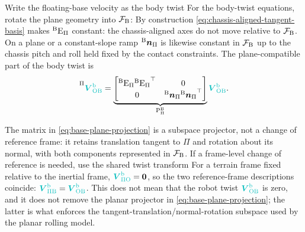 \documentclass[10pt]{article}
\begin{document}
Write the floating-base velocity as the body twist
For the body-twist equations, rotate the plane geometry into $\cframe[fb]$:
By construction \eqref{eq:chassis-aligned-tangent-basis} makes
${}^{\text{B}}\text{E}_{\Pi}$ constant: the chassis-aligned axes do not move
relative to $\cframe[fb]$. On a plane or a constant-slope ramp
${}^{\text{B}}\boldsymbol{n}_{\Pi}$ is likewise constant in $\cframe[fb]$ up to
the chassis pitch and roll held fixed by the contact constraints.
The plane-compatible part of the body twist is
\begin{equation}
  \label{eq:base-plane-projection}
  \prescript{\Pi}{}{\bodyVel{\inertialFrame}{\fbFrame}}
  =
  \underbrace{
    \begin{bmatrix}
      {}^{\fbFrame}\text{E}_{\Pi}
        \transpose{{}^{\fbFrame}\text{E}_{\Pi}} & \zeroMatrix\\
      \zeroMatrix &
        {}^{\fbFrame}\surfaceNormal_{\Pi}
        \transpose{{}^{\fbFrame}\surfaceNormal_{\Pi}}
    \end{bmatrix}
  }_{\text{P}^{\fbFrame}_{\Pi}}
  \bodyVel{\inertialFrame}{\fbFrame}.
\end{equation}


The matrix in \eqref{eq:base-plane-projection} is a subspace projector, not
a change of reference frame: it retains translation tangent to $\Pi$ and
rotation about its normal, with both components represented in $\cframe[fb]$.
If a frame-level change of reference is needed, use the shared twist transform
For a terrain frame fixed relative to the inertial frame,
$\bodyVel{\Pi}{\inertialFrame}=\zeroVector$, so the two reference-frame
descriptions coincide:
$\bodyVel{\Pi}{\fbFrame}=\bodyVel{\inertialFrame}{\fbFrame}$.
This does not mean that the robot twist
$\bodyVel{\inertialFrame}{\fbFrame}$ is zero, and it does not remove the
planar projector in \eqref{eq:base-plane-projection}; the latter is what
enforces the tangent-translation/normal-rotation subspace used by the planar
rolling model.
\end{document}

